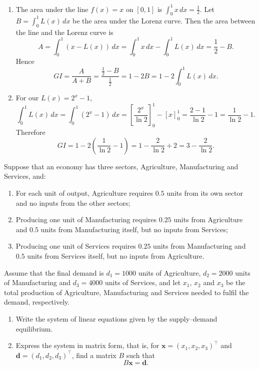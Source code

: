 \documentclass[11pt]{exam}
\begin{document}
\begin{questions}
\begin{solution}
\begin{enumerate}[leftmargin=0.55cm, label=(\alph*), rightmargin=0.2cm]
\item The area under the line $f(x) = x$ on $[0,1]$ is
$
\int_0^1 x\,dx = \frac{1}{2}.
$
Let $B = \int_0^1 L(x)\,dx$ be the area under the Lorenz curve. Then the area between the line and the Lorenz curve is
\[
A = \int_0^1 (x - L(x))\,dx = \int_0^1 x\,dx - \int_0^1 L(x)\,dx = \frac{1}{2} - B.
\]
Hence
\[
GI = \frac{A}{A+B} = \frac{\frac{1}{2} - B}{\frac{1}{2}} = 1 - 2B 
= 1 - 2\int_0^1 L(x)\,dx.
\]

\item For our $L(x) = 2^x - 1$,
\[
\int_0^1 L(x)\,dx = \int_0^1 (2^x - 1)\,dx 
= \left[\frac{2^x}{\ln 2}\right]_0^1 - \left[x\right]_0^1
= \frac{2 - 1}{\ln 2} - 1
= \frac{1}{\ln 2} - 1.
\]
Therefore
\[
GI = 1 - 2\left(\frac{1}{\ln 2} - 1\right)
= 1 - \frac{2}{\ln 2} + 2
= 3 - \frac{2}{\ln 2}.
\]


\end{enumerate}
\end{solution}


\question[3]
     Suppose that an economy has three sectors, Agriculture, Manufacturing and Services, and:
\begin{enumerate}[leftmargin = 0.5cm, label = (\textit{\roman*}), rightmargin = 0.2cm]
    \item For each unit of output, Agriculture requires $0.5$ units from its own sector and no inputs from the other sectors;
    \item Producing one unit of Manufacturing requires $0.25$ units from Agriculture and $0.5$ units from Manufacturing itself, but no inputs from Services;
    \item Producing one unit of Services requires $0.25$ units from Manufacturing and $0.5$ units from Services itself, but no inputs from Agriculture.
\end{enumerate}
Assume that the final demand is $d_1 = 1000$ units of Agriculture, $d_2 = 2000$ units of Manufacturing and $d_3 = 4000$ units of Services, and let $x_1$, $x_2$ and $x_3$ be the total production of Agriculture, Manufacturing and Services needed to fulfil the demand, respectively.

\begin{enumerate}[leftmargin = 0.5cm, label = (\alph*), rightmargin = 0.2cm]

    \item Write the system of linear equations given by the supply–demand equilibrium.

    \item Express the system in matrix form, that is, for $\mathbf{x} = (x_1, x_2, x_3)^\top$ and $\mathbf{d} = (d_1, d_2, d_3)^\top$, find a matrix $B$ such that
    \[
        B \mathbf{x} = \mathbf{d}.
    \]


\end{enumerate}
\end{questions}
\end{document}
